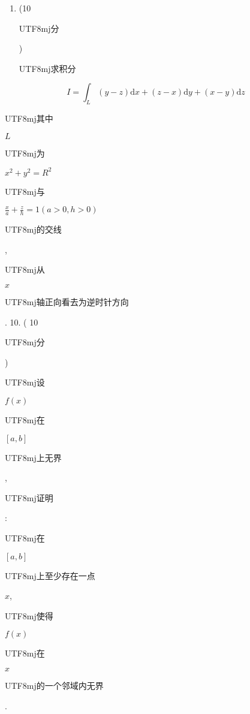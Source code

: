 \documentclass[10pt]{article}
\begin{document}
\begin{enumerate}
  \item (10 \begin{CJK}{UTF8}{mj}分\end{CJK}) \begin{CJK}{UTF8}{mj}求积分\end{CJK}

\end{enumerate}
$$
I=\int_{L}(y-z) \mathrm{d} x+(z-x) \mathrm{d} y+(x-y) \mathrm{d} z
$$
\begin{CJK}{UTF8}{mj}其中\end{CJK} $L$ \begin{CJK}{UTF8}{mj}为\end{CJK} $x^{2}+y^{2}=R^{2}$ \begin{CJK}{UTF8}{mj}与\end{CJK} $\frac{x}{a}+\frac{z}{h}=1(a>0, h>0)$ \begin{CJK}{UTF8}{mj}的交线\end{CJK}, \begin{CJK}{UTF8}{mj}从\end{CJK} $x$ \begin{CJK}{UTF8}{mj}轴正向看去为逆时针方向\end{CJK}. 10. ( 10 \begin{CJK}{UTF8}{mj}分\end{CJK}) \begin{CJK}{UTF8}{mj}设\end{CJK} $f(x)$ \begin{CJK}{UTF8}{mj}在\end{CJK} $[a, b]$ \begin{CJK}{UTF8}{mj}上无界\end{CJK}, \begin{CJK}{UTF8}{mj}证明\end{CJK}: \begin{CJK}{UTF8}{mj}在\end{CJK} $[a, b]$ \begin{CJK}{UTF8}{mj}上至少存在一点\end{CJK} $x$, \begin{CJK}{UTF8}{mj}使得\end{CJK} $f(x)$ \begin{CJK}{UTF8}{mj}在\end{CJK} $x$ \begin{CJK}{UTF8}{mj}的一个邻域内无界\end{CJK}.
\end{document}
